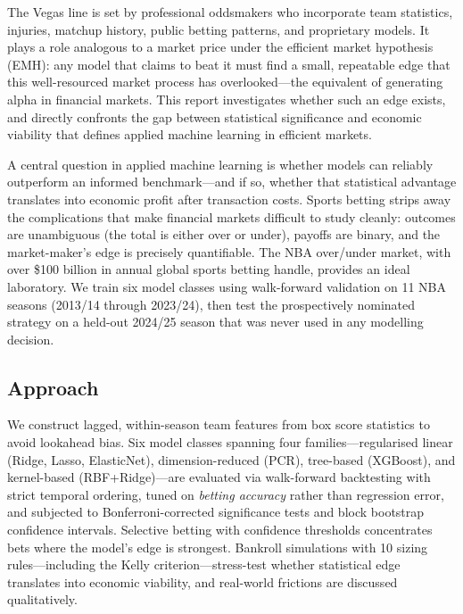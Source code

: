 \documentclass[11pt]{extarticle}
\begin{document}
The Vegas line is set by professional oddsmakers who incorporate team statistics, injuries, matchup history, public betting patterns, and proprietary models. It plays a role analogous to a market price under the efficient market hypothesis (EMH): any model that claims to beat it must find a small, repeatable edge that this well-resourced market process has overlooked---the equivalent of generating alpha in financial markets. This report investigates whether such an edge exists, and directly confronts the gap between statistical significance and economic viability that defines applied machine learning in efficient markets.

A central question in applied machine learning is whether models can reliably outperform an informed benchmark---and if so, whether that statistical advantage translates into economic profit after transaction costs. Sports betting strips away the complications that make financial markets difficult to study cleanly: outcomes are unambiguous (the total is either over or under), payoffs are binary, and the market-maker's edge is precisely quantifiable. The NBA over/under market, with over \$100 billion in annual global sports betting handle, provides an ideal laboratory. We train six model classes using walk-forward validation on 11 NBA seasons (2013/14 through 2023/24), then test the prospectively nominated strategy on a held-out 2024/25 season that was never used in any modelling decision.

\subsection{Approach}
We construct lagged, within-season team features from box score statistics to avoid lookahead bias. Six model classes spanning four families---regularised linear (Ridge, Lasso, ElasticNet), dimension-reduced (PCR), tree-based (XGBoost), and kernel-based (RBF+Ridge)---are evaluated via walk-forward backtesting with strict temporal ordering, tuned on \emph{betting accuracy} rather than regression error, and subjected to Bonferroni-corrected significance tests and block bootstrap confidence intervals. Selective betting with confidence thresholds concentrates bets where the model's edge is strongest. Bankroll simulations with 10 sizing rules---including the Kelly criterion---stress-test whether statistical edge translates into economic viability, and real-world frictions are discussed qualitatively.

\end{document}
